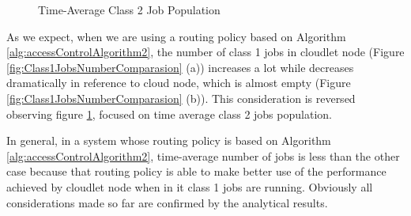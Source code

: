 \documentclass[10pt,a4paper]{article}
\begin{document}
\begin{figure}[h!]
    \centering
    \caption{Time-Average Class 2 Job Population}%
    \label{fig:Class2JobsNumberComparasion}
\end{figure}

As we expect, when we are using a routing policy based on Algorithm \ref{alg:accessControlAlgorithm2}, the number of class 1 jobs in cloudlet node (Figure \ref{fig:Class1JobsNumberComparasion} (a)) increases a lot while decreases dramatically in reference to cloud node, which is almost empty (Figure \ref{fig:Class1JobsNumberComparasion} (b)).
This consideration is reversed observing figure \ref{fig:Class2JobsNumberComparasion}, focused on time average class 2 jobs population.  

In general, in a system whose routing policy is based on Algorithm \ref{alg:accessControlAlgorithm2}, time-average number of jobs is less than the other case because that routing policy is able to make better use of the performance achieved by cloudlet node when in it class 1 jobs are running. Obviously all considerations made so far are confirmed by the analytical results.
\end{document}
